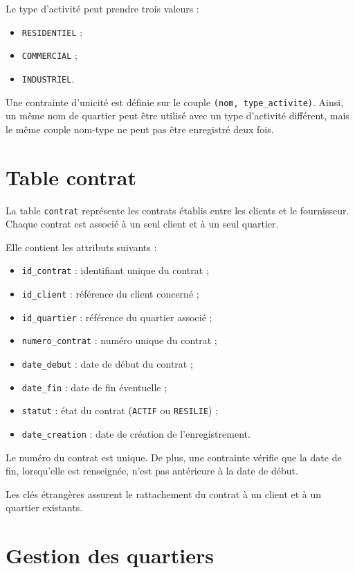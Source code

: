 Le type d'activité peut prendre trois valeurs :
\begin{itemize}
    \item \texttt{RESIDENTIEL} ;
    \item \texttt{COMMERCIAL} ;
    \item \texttt{INDUSTRIEL}.
\end{itemize}

Une contrainte d'unicité est définie sur le couple
\texttt{(nom, type\_activite)}. Ainsi, un même nom de quartier peut être utilisé avec un type d'activité différent, mais le même couple nom-type ne peut pas être enregistré deux fois.

\section{Table contrat}

La table \texttt{contrat} représente les contrats établis entre les clients et le fournisseur. Chaque contrat est associé à un seul client et à un seul quartier.

Elle contient les attributs suivants :
\begin{itemize}
    \item \texttt{id\_contrat} : identifiant unique du contrat ;
    \item \texttt{id\_client} : référence du client concerné ;
    \item \texttt{id\_quartier} : référence du quartier associé ;
    \item \texttt{numero\_contrat} : numéro unique du contrat ;
    \item \texttt{date\_debut} : date de début du contrat ;
    \item \texttt{date\_fin} : date de fin éventuelle ;
    \item \texttt{statut} : état du contrat (\texttt{ACTIF} ou \texttt{RESILIE}) ;
    \item \texttt{date\_creation} : date de création de l'enregistrement.
\end{itemize}

Le numéro du contrat est unique. De plus, une contrainte vérifie que la date de fin, lorsqu'elle est renseignée, n'est pas antérieure à la date de début.

Les clés étrangères assurent le rattachement du contrat à un client et à un quartier existants.

\section{Gestion des quartiers}

